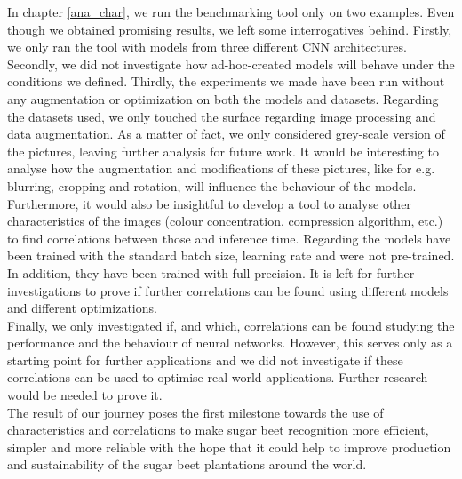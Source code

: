 In chapter \ref{ana_char}, we run the benchmarking tool only on two examples. Even though we obtained promising results, we left some interrogatives behind. Firstly, we only ran the tool with models from three different CNN architectures. Secondly, we did not investigate how ad-hoc-created models will behave under the conditions we defined. Thirdly, the experiments we made have been run without any augmentation or optimization on both the models and datasets. Regarding the datasets used, we only touched the surface regarding image processing and data augmentation. As a matter of fact, we only considered grey-scale version of the pictures, leaving further analysis for future work. It would be interesting to analyse how the augmentation and modifications of these pictures, like for e.g. blurring, cropping and rotation, will influence the behaviour of the models. Furthermore, it would also be insightful to develop a tool to analyse other characteristics of the images (colour concentration, compression algorithm, etc.) to find correlations between those and inference time. Regarding the models have been trained with the standard batch size, learning rate and were not pre-trained. In addition, they have been trained with full precision. It is left for further investigations to prove if further correlations can be found using different models and different optimizations.\\
Finally, we only investigated if, and which, correlations can be found studying the performance and the behaviour of neural networks. However, this serves only as a starting point for further applications and we did not investigate if these correlations can be used to optimise real world applications. Further research would be needed to prove it. \\
The result of our journey poses the first milestone towards the use of characteristics and correlations to make sugar beet recognition more efficient, simpler and more reliable with the hope that it could help to improve production and sustainability of the sugar beet plantations around the world. 

